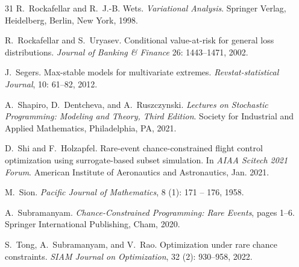 \documentclass[a4paper, a4wide, 10pt, reqno]{amsart}
\theoremstyle{plain}
\begin{document}
\begin{thebibliography}{31}
R.~Rockafellar and R.~J.-B. Wets.
\newblock \emph{Variational Analysis}.
\newblock Springer Verlag, Heidelberg, Berlin, New York, 1998.


R.~Rockafellar and S.~Uryasev.
\newblock Conditional value-at-risk for general loss distributions.
\newblock \emph{Journal of Banking \& Finance}
26: 1443--1471, 2002.


J.~Segers.
\newblock Max-stable models for multivariate extremes.
\newblock \emph{Revstat-statistical Journal}, 10: 61--82, 2012.

A.~Shapiro, D.~Dentcheva, and A.~Ruszczynski.
\newblock \emph{Lectures on Stochastic Programming: Modeling and Theory, Third Edition}.
\newblock Society for Industrial and Applied Mathematics, Philadelphia, PA, 2021.

D.~Shi and F.~Holzapfel.
\newblock Rare-event chance-constrained flight control optimization using surrogate-based subset simulation.
\newblock In \emph{AIAA Scitech 2021 Forum}. American Institute of Aeronautics and Astronautics, Jan. 2021.

M.~Sion.
\newblock \emph{Pacific Journal of Mathematics}, 8 (1): 171 -- 176, 1958.

A.~Subramanyam.
\newblock \emph{Chance-Constrained Programming: Rare Events}, pages 1--6.
\newblock Springer International Publishing, Cham, 2020.

S.~Tong, A.~Subramanyam, and V.~Rao.
\newblock Optimization under rare chance constraints.
\newblock \emph{SIAM Journal on Optimization}, 32 (2): 930--958, 2022{}.



\end{thebibliography}
% 
% 
\end{document}
